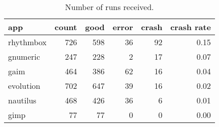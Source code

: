 \documentclass[times,10pt,twocolumn]{article}
\begin{document}
\begin{table}
  \centering
  \begin{tabular}{lrrrrr}
    app & count & good & error & crash & crash rate \\ \hline
    rhythmbox & 726 & 598 & 36 & 92 & 0.15 \\
    gnumeric & 247 & 228 & 2 & 17 & 0.07 \\
    gaim & 464 & 386 & 62 & 16 & 0.04 \\
    evolution & 702 & 647 & 39 & 16 & 0.02 \\
    nautilus & 468 & 426 & 36 & 6 & 0.01 \\
    gimp & 77 & 77 & 0 & 0 & 0.00
  \end{tabular}
  \caption{Number of runs received.}  
  \label{reports-per-app}
\end{table}


\end{document}
